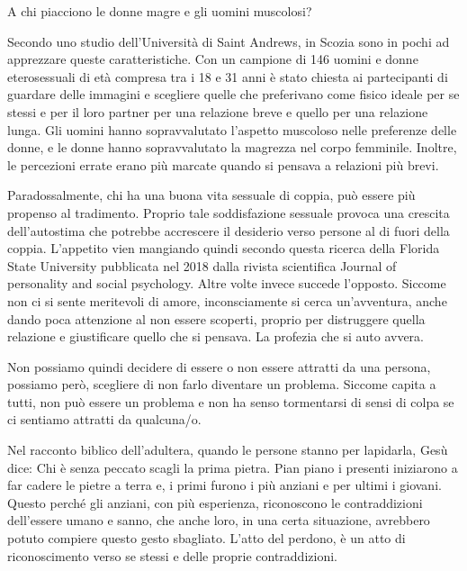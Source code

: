 \documentclass[12pt]{book} %
\begin{document}
\begin{mdframed}[linewidth=1pt]
A chi piacciono le donne magre e gli uomini muscolosi?

Secondo uno studio dell'Università di Saint Andrews, in Scozia sono in pochi ad apprezzare queste caratteristiche. Con
un campione di 146 uomini e donne eterosessuali di età compresa tra i 18 e 31 anni è stato chiesta ai partecipanti di
guardare delle immagini e scegliere quelle che preferivano come fisico ideale per se stessi e per il loro partner per
una relazione breve e quello per una relazione lunga. Gli uomini hanno sopravvalutato l'aspetto muscoloso nelle
preferenze delle donne, e le donne hanno sopravvalutato la magrezza nel corpo femminile. Inoltre, le percezioni errate
erano più marcate quando si pensava a relazioni più brevi.
\end{mdframed}

Paradossalmente, chi ha una buona vita sessuale di coppia, può essere più propenso al tradimento. Proprio tale
soddisfazione sessuale provoca una crescita dell'autostima che potrebbe accrescere il desiderio
verso persone al di fuori della coppia. L'appetito vien mangiando quindi secondo questa ricerca
della Florida State University pubblicata nel 2018 dalla rivista scientifica Journal of personality and social
psychology. Altre volte invece succede l'opposto. Siccome non ci si sente meritevoli di amore,
inconsciamente si cerca un'avventura, anche dando poca attenzione al non essere scoperti, proprio
per distruggere quella relazione e giustificare quello che si pensava. La profezia che si auto avvera.

Non possiamo quindi decidere di essere o non essere attratti da una persona, possiamo però, scegliere di non farlo
diventare un problema. Siccome capita a tutti, non può essere un problema e non ha senso tormentarsi di sensi di colpa
se ci sentiamo attratti da qualcuna/o.

Nel racconto biblico dell'adultera, quando le persone stanno per lapidarla, Gesù dice: Chi è senza peccato scagli la
prima pietra. Pian piano i presenti iniziarono a far cadere le pietre a terra e, i primi furono i più anziani e per
ultimi i giovani. Questo perché gli anziani, con più esperienza, riconoscono le contraddizioni
dell'essere umano e sanno, che anche loro, in una certa situazione, avrebbero potuto compiere
questo gesto sbagliato. L'atto del perdono, è un atto di riconoscimento verso se stessi e delle proprie contraddizioni.
\end{document}
